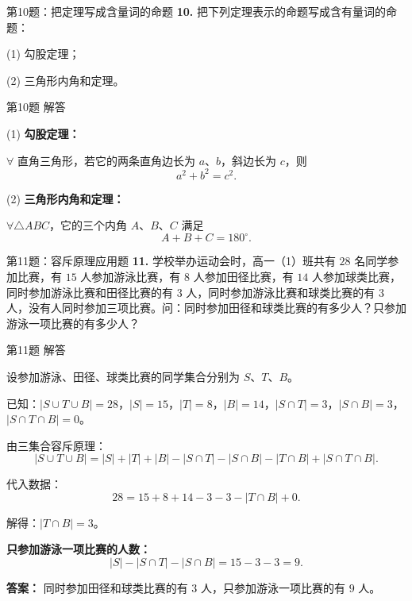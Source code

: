 \documentclass[10pt,aspectratio=169,serif]{beamer}
\begin{document}
\begin{frame}[t]{第10题：把定理写成含量词的命题}
\textbf{10.} 把下列定理表示的命题写成含有量词的命题：

\vspace{0.5em}
(1) 勾股定理；

\vspace{0.3em}
(2) 三角形内角和定理。
\end{frame}

\begin{frame}[t]{第10题 解答}
\begin{tcolorbox}[colback=orange!10,colframe=orange,title=\textbf{解}]
(1) \textbf{勾股定理：}

\vspace{0.3em}
$\forall$ 直角三角形，若它的两条直角边长为 $a$、$b$，斜边长为 $c$，则
\[
a^2 + b^2 = c^2.
\]

\vspace{0.8em}
(2) \textbf{三角形内角和定理：}

\vspace{0.3em}
$\forall \triangle ABC$，它的三个内角 $A$、$B$、$C$ 满足
\[
A + B + C = 180^\circ.
\]
\end{tcolorbox}
\end{frame}

\begin{frame}[t]{第11题：容斥原理应用题}
\textbf{11.} 学校举办运动会时，高一（1）班共有 $28$ 名同学参加比赛，有 $15$ 人参加游泳比赛，有 $8$ 人参加田径比赛，有 $14$ 人参加球类比赛，同时参加游泳比赛和田径比赛的有 $3$ 人，同时参加游泳比赛和球类比赛的有 $3$ 人，没有人同时参加三项比赛。问：同时参加田径和球类比赛的有多少人？只参加游泳一项比赛的有多少人？
\end{frame}

\begin{frame}[t]{第11题 解答}
\begin{tcolorbox}[colback=orange!10,colframe=orange,title=\textbf{解}]
设参加游泳、田径、球类比赛的同学集合分别为 $S$、$T$、$B$。

\vspace{0.5em}
已知：$|S \cup T \cup B| = 28$，$|S| = 15$，$|T| = 8$，$|B| = 14$，$|S \cap T| = 3$，$|S \cap B| = 3$，$|S \cap T \cap B| = 0$。

\vspace{0.5em}
由三集合容斥原理：
\[
|S \cup T \cup B| = |S| + |T| + |B| - |S \cap T| - |S \cap B| - |T \cap B| + |S \cap T \cap B|.
\]

\vspace{0.3em}
代入数据：
\[
28 = 15 + 8 + 14 - 3 - 3 - |T \cap B| + 0.
\]

\vspace{0.3em}
解得：$|T \cap B| = 3$。

\vspace{0.5em}
\textbf{只参加游泳一项比赛的人数：}
\[
|S| - |S \cap T| - |S \cap B| = 15 - 3 - 3 = 9.
\]

\vspace{0.5em}
\textbf{答案：} 同时参加田径和球类比赛的有 $3$ 人，只参加游泳一项比赛的有 $9$ 人。
\end{tcolorbox}
\end{frame}
\end{document}
